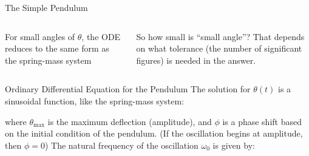 \documentclass[12pt,compress,aspectratio=169]{beamer}
\begin{document}
\begin{frame}{The Simple Pendulum}
  \begin{columns}
    For small angles of $\theta$, the ODE reduces to the same form as the
    spring-mass system


    So how small is ``small angle''? That depends on what tolerance (the
    number of significant figures) is needed in the answer.
    
  \end{columns}
\end{frame}



\begin{frame}{Ordinary Differential Equation for the Pendulum}
  The solution for $\theta(t)$ is a sinusoidal function, like the spring-mass
  system:


  where $\theta_\text{max}$ is the maximum deflection (amplitude), and $\phi$
  is a phase shift based on the initial condition of the pendulum. (If the
  oscillation begins at amplitude, then $\phi=0$) The natural frequency of
  the oscillation $\omega_0$ is given by:
    
\end{frame}
\end{document}
